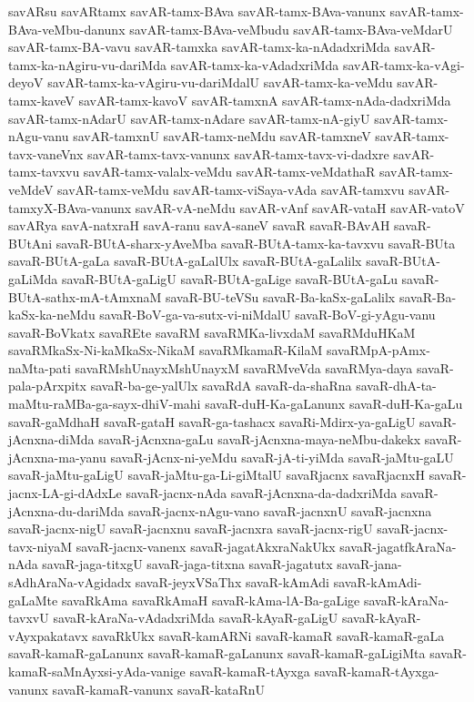 {savARsu
savARtamx
savAR-tamx-BAva
savAR-tamx-BAva-vanunx
savAR-tamx-BAva-veMbu-danunx
savAR-tamx-BAva-veMbudu
savAR-tamx-BAva-veMdarU
savAR-tamx-BA-vavu
savAR-tamxka
savAR-tamx-ka-nAdadxriMda
savAR-tamx-ka-nAgiru-vu-dariMda
savAR-tamx-ka-vAdadxriMda
savAR-tamx-ka-vAgi-deyoV
savAR-tamx-ka-vAgiru-vu-dariMdalU
savAR-tamx-ka-veMdu
savAR-tamx-kaveV
savAR-tamx-kavoV
savAR-tamxnA
savAR-tamx-nAda-dadxriMda
savAR-tamx-nAdarU
savAR-tamx-nAdare
savAR-tamx-nA-giyU
savAR-tamx-nAgu-vanu
savAR-tamxnU
savAR-tamx-neMdu
savAR-tamxneV
savAR-tamx-tavx-vaneVnx
savAR-tamx-tavx-vanunx
savAR-tamx-tavx-vi-dadxre
savAR-tamx-tavxvu
savAR-tamx-valalx-veMdu
savAR-tamx-veMdathaR
savAR-tamx-veMdeV
savAR-tamx-veMdu
savAR-tamx-viSaya-vAda
savAR-tamxvu
savAR-tamxyX-BAva-vanunx
savAR-vA-neMdu
savAR-vAnf
savAR-vataH
savAR-vatoV
savARya
savA-natxraH
savA-ranu
savA-saneV
savaR
savaR-BAvAH
savaR-BUtAni
savaR-BUtA-sharx-yAveMba
savaR-BUtA-tamx-ka-tavxvu
savaR-BUta
savaR-BUtA-gaLa
savaR-BUtA-gaLalUlx
savaR-BUtA-gaLalilx
savaR-BUtA-gaLiMda
savaR-BUtA-gaLigU
savaR-BUtA-gaLige
savaR-BUtA-gaLu
savaR-BUtA-sathx-mA-tAmxnaM
savaR-BU-teVSu
savaR-Ba-kaSx-gaLalilx
savaR-Ba-kaSx-ka-neMdu
savaR-BoV-ga-va-sutx-vi-niMdalU
savaR-BoV-gi-yAgu-vanu
savaR-BoVkatx
savaREte
savaRM
savaRMKa-livxdaM
savaRMduHKaM
savaRMkaSx-Ni-kaMkaSx-NikaM
savaRMkamaR-KilaM
savaRMpA-pAmx-naMta-pati
savaRMshUnayxMshUnayxM
savaRMveVda
savaRMya-daya
savaR-pala-pArxpitx
savaR-ba-ge-yalUlx
savaRdA
savaR-da-shaRna
savaR-dhA-ta-maMtu-raMBa-ga-sayx-dhiV-mahi
savaR-duH-Ka-gaLanunx
savaR-duH-Ka-gaLu
savaR-gaMdhaH
savaR-gataH
savaR-ga-tashacx
savaRi-Mdirx-ya-gaLigU
savaR-jAcnxna-diMda
savaR-jAcnxna-gaLu
savaR-jAcnxna-maya-neMbu-dakekx
savaR-jAcnxna-ma-yanu
savaR-jAcnx-ni-yeMdu
savaR-jA-ti-yiMda
savaR-jaMtu-gaLU
savaR-jaMtu-gaLigU
savaR-jaMtu-ga-Li-giMtalU
savaRjacnx
savaRjacnxH
savaR-jacnx-LA-gi-dAdxLe
savaR-jacnx-nAda
savaR-jAcnxna-da-dadxriMda
savaR-jAcnxna-du-dariMda
savaR-jacnx-nAgu-vano
savaR-jacnxnU
savaR-jacnxna
savaR-jacnx-nigU
savaR-jacnxnu
savaR-jacnxra
savaR-jacnx-rigU
savaR-jacnx-tavx-niyaM
savaR-jacnx-vanenx
savaR-jagatAkxraNakUkx
savaR-jagatfkAraNa-nAda
savaR-jaga-titxgU
savaR-jaga-titxna
savaR-jagatutx
savaR-jana-sAdhAraNa-vAgidadx
savaR-jeyxVSaThx
savaR-kAmAdi
savaR-kAmAdi-gaLaMte
savaRkAma
savaRkAmaH
savaR-kAma-lA-Ba-gaLige
savaR-kAraNa-tavxvU
savaR-kAraNa-vAdadxriMda
savaR-kAyaR-gaLigU
savaR-kAyaR-vAyxpakatavx
savaRkUkx
savaR-kamARNi
savaR-kamaR
savaR-kamaR-gaLa
savaR-kamaR-gaLanunx
savaR-kamaR-gaLanunx
savaR-kamaR-gaLigiMta
savaR-kamaR-saMnAyxsi-yAda-vanige
savaR-kamaR-tAyxga
savaR-kamaR-tAyxga-vanunx
savaR-kamaR-vanunx
savaR-kataRnU
}
